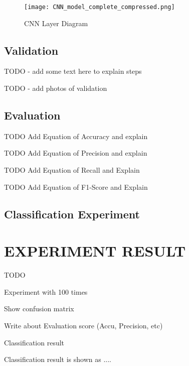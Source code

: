 \documentclass[conference]{IEEEtran}
\begin{document}

\begin{figure}[htbp]
\centerline{\texttt{[image: CNN\_model\_complete\_compressed.png]}}
\caption{CNN Layer Diagram}
\label{fig_CNN}
\end{figure}

\subsection{Validation}

TODO - add some text here to explain steps

TODO - add photos of validation


\subsection{Evaluation}

TODO Add Equation of Accuracy and explain

TODO Add Equation of Precision and explain

TODO Add Equation of Recall and Explain

TODO Add Equation of F1-Score and Explain

\subsection{Classification Experiment}



\section{EXPERIMENT RESULT}





TODO 

Experiment with 100 times

Show confusion matrix 

Write about Evaluation score (Accu, Precision, etc)

Classification result

Classification result is shown as  ....
\\
\end{document}

